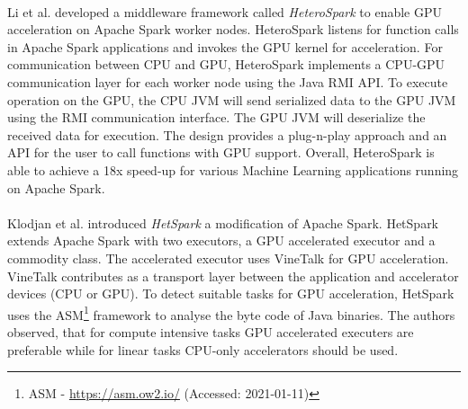 \paragraph{}
Li et al. \cite{Li2015HeteroSpark} developed a middleware framework called \textit{HeteroSpark} to enable GPU acceleration on Apache Spark worker nodes. HeteroSpark listens for function calls in Apache Spark applications and invokes the GPU kernel for acceleration. For communication between CPU and GPU, HeteroSpark implements a CPU-GPU communication layer for each worker node using the Java RMI API. To execute operation on the GPU, the CPU JVM will send serialized data to the GPU JVM using the RMI communication interface. The GPU JVM will deserialize the received data for execution.
The design provides a plug-n-play approach and an API for the user to call functions with GPU support.
Overall, HeteroSpark is able to achieve a 18x speed-up for various Machine Learning applications running on Apache Spark.


\paragraph{}
Klodjan et al. \cite{Klodjan2018HetSpark} introduced \textit{HetSpark} a modification of Apache Spark.
HetSpark extends Apache Spark with two executors, a GPU accelerated executor and a commodity class. 
The accelerated executor uses VineTalk\cite{Mavridis2017VineTalk} for GPU acceleration.
VineTalk contributes as a transport layer between the application and accelerator devices (CPU or GPU).
To detect suitable tasks for GPU acceleration, HetSpark uses the ASM\footnote{ASM - \url{https://asm.ow2.io/} (Accessed: 2021-01-11)} framework to analyse the byte code of Java binaries.
The authors observed, that for compute intensive tasks GPU accelerated executers are preferable while for linear tasks CPU-only accelerators should be used.


